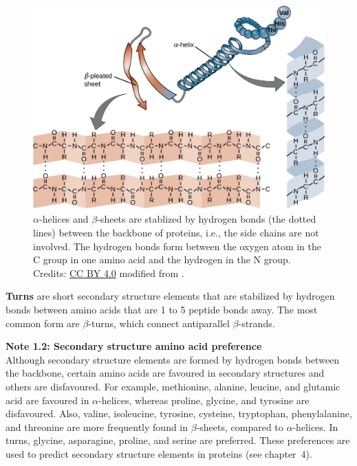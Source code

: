 % 

\begin{figure}[!htbp]
\centering
\includegraphics[width=0.8\linewidth]{files/secstructure_alt-aad81a4d80b9af3bc2a1f645520d36e5.jpg}
\caption[]{$\alpha$-helices and $\beta$-sheets are stablized by hydrogen bonds (the dotted lines) between the backbone of proteins, i.e., the side chains are not involved.
The hydrogen bonds form between the oxygen atom in the C group in one amino acid and the hydrogen in the N group.
Credits: \href{https://creativecommons.org/licenses/by/4.0}{CC BY 4.0} modified from \cite{secstructure_alt_nd}.}
\label{secstructure_alt}
\end{figure}

\textbf{Turns} are short secondary structure elements that are stabilized by hydrogen bonds between amino acids that are 1 to 5 peptide bonds away.
The most common form are $\beta$-turns, which connect antiparallel $\beta$-strands.

\begin{framed}
\textbf{Note 1.2: Secondary structure amino acid preference}\\
Although secondary structure elements are formed by hydrogen bonds between the backbone, certain amino acids are favoured in secondary structures and others are disfavoured.
For example, methionine, alanine, leucine, and glutamic acid are favoured in $\alpha$-helices, whereas proline, glycine, and tyrosine are disfavoured.
Also, valine, isoleucine, tyrosine, cysteine, tryptophan, phenylalanine, and threonine are more frequently found in $\beta$-sheets, compared to $\alpha$-helices.
In turns, glycine, asparagine, proline, and serine are preferred.
These preferences are used to predict secondary structure elements in proteins (see chapter~4).
\end{framed}


